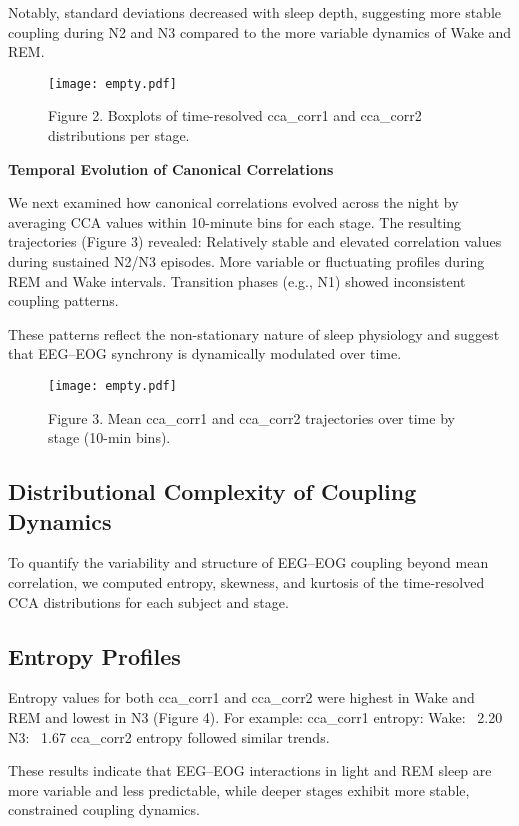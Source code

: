Notably, standard deviations decreased with sleep depth, suggesting more stable coupling during N2 and N3 compared to the more variable dynamics of Wake and REM.

\begin{figure}
\centering
\texttt{[image: empty.pdf]}
\caption{Figure 2. Boxplots of time-resolved cca_corr1 and cca_corr2 distributions per stage.}
\end{figure}

\textbf{Temporal Evolution of Canonical Correlations}

We next examined how canonical correlations evolved across the night by averaging CCA values within 10-minute bins for each stage. The resulting trajectories (Figure 3) revealed:
Relatively stable and elevated correlation values during sustained N2/N3 episodes.
More variable or fluctuating profiles during REM and Wake intervals.
Transition phases (e.g., N1) showed inconsistent coupling patterns.

These patterns reflect the non-stationary nature of sleep physiology and suggest that EEG–EOG synchrony is dynamically modulated over time.

\begin{figure}
\centering
\texttt{[image: empty.pdf]}
\caption{Figure 3. Mean cca_corr1 and cca_corr2 trajectories over time by stage (10-min bins).}
\end{figure}

\subsection{Distributional Complexity of Coupling Dynamics}

To quantify the variability and structure of EEG–EOG coupling beyond mean correlation, we computed entropy, skewness, and kurtosis of the time-resolved CCA distributions for each subject and stage.

\subsection{Entropy Profiles}

Entropy values for both cca_corr1 and cca_corr2 were highest in Wake and REM and lowest in N3 (Figure 4). 
For example:
cca_corr1 entropy:
Wake: ~2.20
N3: ~1.67
cca_corr2 entropy followed similar trends.

These results indicate that EEG–EOG interactions in light and REM sleep are more variable and less predictable, while deeper stages exhibit more stable, constrained coupling dynamics.

